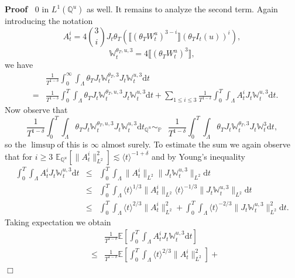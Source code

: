 \documentclass[11pt]{article}
\newcommand{\mathd}{\mathrm{d}}
\newenvironment{proof}{\noindent\textbf{Proof\ }}{\hspace*{\fill}$\Box$\medskip}
\begin{document}
\begin{proof}
  $0$ in $L^1 (\mathbb{Q}^u)$ as well. It remains to analyze the second term.
  Again introducing the notation
  \[ A_t^i = 4 \binom{3}{i} J_t \theta_T (\llbracket (\theta_T W^u_t)^{3 - i}
     \rrbracket (\theta_T I_t (u))^i), \]
  \[ \mathbb{W}_t^{\theta_T, u, 3} = 4 \llbracket (\theta_T W^u_t)^3
     \rrbracket, \]
  we have
  \begin{eqnarray*}
    &  & \frac{1}{T^{1 - \delta}} \int^{\infty}_0 \int_{\Lambda} \theta_T J_t
    \mathbb{W}_t^{\theta_T, 3} J_t \mathbb{W}_t^{u, 3} \mathd t\\
    & = & \frac{1}{T^{1 - \delta}} \int^T_0 \int_{\Lambda} \theta_T J_t
    \mathbb{W}_t^{\theta_T, u, 3} J_t \mathbb{W}_t^{u, 3} \mathd t + \sum_{1
    \leqslant i \leqslant 3} \frac{1}{T^{1 - \delta}} \int^T_0 \int_{\Lambda}
    A_t^i J_t \mathbb{W}_t^{u, 3} \mathd t.
  \end{eqnarray*}
  Now observe that
  \[ \frac{1}{T^{1 - \delta}} \int^T_0 \int_{\Lambda} \theta_T J_t
     \mathbb{W}_t^{\theta_T, u, 3} J_t \mathbb{W}_t^{u, 3} \mathd t
     _{\mathbb{Q}^u} \sim_{\mathbb{P} \quad} \frac{1}{T^{1 - \delta}} \int^T_0
     \int_{\Lambda} \theta_T J_t \mathbb{W}_t^{\theta_T, 3} J_t \mathbb{W}_t^3
     \mathd t, \]
  so the $\limsup$of this is $\infty$ almost surely. To estimate the sum we
  again observe that for $i \geqslant 3$ $\mathbb{E}_{\mathbb{Q}^u} [\| A_t^i
  \|^2_{L^2}] \lesssim \langle t \rangle^{- 1 + \delta}$ and by Young's
  inequality
  \[ \begin{array}{lll}
       \int^T_0 \int_{\Lambda} A_t^i J_t \mathbb{W}_t^{u, 3} \mathd t &
       \leqslant & \int^T_0 \int_{\Lambda} \| A_t^i \|_{L^2} \| J_t
       \mathbb{W}_t^{u, 3} \|_{L^2} \mathd t\\
       & \leqslant & \int^T_0 \int_{\Lambda} \langle t \rangle^{1 / 3} \|
       A_t^i \|_{L^2} \langle t \rangle^{- 1 / 3} \| J_t \mathbb{W}_t^{u, 3}
       \|_{L^2} \mathd t\\
       & \leqslant & \int^T_0 \int_{\Lambda} \langle t \rangle^{2 / 3} \|
       A_t^i \|^2_{L^2} + \int^T_0 \int_{\Lambda} \langle t \rangle^{- 2 / 3}
       \| J_t \mathbb{W}_t^{u, 3} \|^2_{L^2} \mathd t.
     \end{array} \]
  Taking expectation we obtain
  \begin{eqnarray*}
    &  & \frac{1}{T^{1 - \delta}} \mathbb{E} \left[ \int^T_0 \int_{\Lambda}
    A_t^i J_t \mathbb{W}_t^{u, 3} \mathd t \right]\\
    & \leqslant & \frac{1}{T^{1 - \delta}} \mathbb{E} \left[ \int^T_0
    \int_{\Lambda} \langle t \rangle^{2 / 3} \| A_t^i \|^2_{L^2} \right] +

\end{eqnarray*}
\end{proof}
\end{document}

